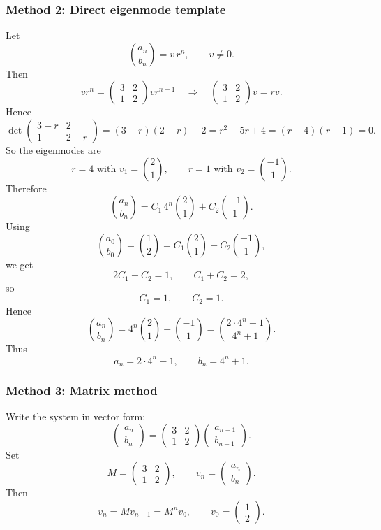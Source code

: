 \documentclass[12pt]{article}
\begin{document}
\newpage
\subsubsection{Method 2: Direct eigenmode template}
Let
\[
\binom{a_n}{b_n}=v\,r^n,\qquad
v\neq 0.
\]
Then
\[
v r^n=
\begin{pmatrix}
3 & 2\\
1 & 2
\end{pmatrix}
v r^{n-1}
\quad\Longrightarrow\quad
\begin{pmatrix}
3 & 2\\
1 & 2
\end{pmatrix}v=r v.
\]
Hence
\[
\det\!\begin{pmatrix}
3-r & 2\\
1 & 2-r
\end{pmatrix}
=(3-r)(2-r)-2=r^2-5r+4=(r-4)(r-1)=0.
\]
So the eigenmodes are
\[
r=4 \text{ with } v_1=\binom21,
\qquad
r=1 \text{ with } v_2=\binom{-1}{1}.
\]
Therefore
\[
\binom{a_n}{b_n}
=C_1\,4^n\binom21+C_2\binom{-1}{1}.
\]
Using
\[
\binom{a_0}{b_0}
=\binom12
=
C_1\binom21+C_2\binom{-1}{1},
\]
we get
\[
2C_1-C_2=1,\qquad C_1+C_2=2,
\]
so
\[
C_1=1,\qquad C_2=1.
\]
Hence
\[
\binom{a_n}{b_n}
=
4^n\binom21+\binom{-1}{1}
=
\binom{2\cdot 4^n-1}{4^n+1}.
\]
Thus
\[
\boxed{a_n=2\cdot 4^n-1,\qquad b_n=4^n+1.}
\]

\newpage
\subsubsection{Method 3: Matrix method}
Write the system in vector form:
\[
\begin{pmatrix}
a_n\\
b_n
\end{pmatrix}
=
\begin{pmatrix}
3 & 2\\
1 & 2
\end{pmatrix}
\begin{pmatrix}
a_{n-1}\\
b_{n-1}
\end{pmatrix}.
\]
Set
\[
M=\begin{pmatrix}
3 & 2\\
1 & 2
\end{pmatrix},\qquad
v_n=\begin{pmatrix}
a_n\\
b_n
\end{pmatrix}.
\]
Then
\[
v_n=Mv_{n-1}=M^n v_0,
\qquad
v_0=\begin{pmatrix}1\\2\end{pmatrix}.
\]
\end{document}
